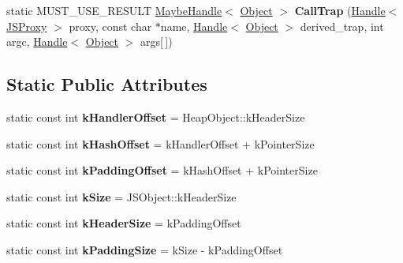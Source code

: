 \begin{DoxyCompactItemize}
\item 
\hypertarget{classv8_1_1internal_1_1_j_s_proxy_acb6cfffc6beeb32d176707a98ccaadd5}{}static M\+U\+S\+T\+\_\+\+U\+S\+E\+\_\+\+R\+E\+S\+U\+L\+T \hyperlink{classv8_1_1internal_1_1_maybe_handle}{Maybe\+Handle}$<$ \hyperlink{classv8_1_1internal_1_1_object}{Object} $>$ {\bfseries Call\+Trap} (\hyperlink{classv8_1_1internal_1_1_handle}{Handle}$<$ \hyperlink{classv8_1_1internal_1_1_j_s_proxy}{J\+S\+Proxy} $>$ proxy, const char $\ast$name, \hyperlink{classv8_1_1internal_1_1_handle}{Handle}$<$ \hyperlink{classv8_1_1internal_1_1_object}{Object} $>$ derived\+\_\+trap, int argc, \hyperlink{classv8_1_1internal_1_1_handle}{Handle}$<$ \hyperlink{classv8_1_1internal_1_1_object}{Object} $>$ args\mbox{[}$\,$\mbox{]})\label{classv8_1_1internal_1_1_j_s_proxy_acb6cfffc6beeb32d176707a98ccaadd5}

\end{DoxyCompactItemize}
\subsection*{Static Public Attributes}
\begin{DoxyCompactItemize}
\item 
\hypertarget{classv8_1_1internal_1_1_j_s_proxy_aa806e0b972c00bd7011605e4859a4a0e}{}static const int {\bfseries k\+Handler\+Offset} = Heap\+Object\+::k\+Header\+Size\label{classv8_1_1internal_1_1_j_s_proxy_aa806e0b972c00bd7011605e4859a4a0e}

\item 
\hypertarget{classv8_1_1internal_1_1_j_s_proxy_a168ff8fa92638a10a3cdd1f4701097df}{}static const int {\bfseries k\+Hash\+Offset} = k\+Handler\+Offset + k\+Pointer\+Size\label{classv8_1_1internal_1_1_j_s_proxy_a168ff8fa92638a10a3cdd1f4701097df}

\item 
\hypertarget{classv8_1_1internal_1_1_j_s_proxy_a912bf6dd6649f735f2c049b89c42a3e4}{}static const int {\bfseries k\+Padding\+Offset} = k\+Hash\+Offset + k\+Pointer\+Size\label{classv8_1_1internal_1_1_j_s_proxy_a912bf6dd6649f735f2c049b89c42a3e4}

\item 
\hypertarget{classv8_1_1internal_1_1_j_s_proxy_a59ed1c6e05e6ea07645c40c9567bfe8c}{}static const int {\bfseries k\+Size} = J\+S\+Object\+::k\+Header\+Size\label{classv8_1_1internal_1_1_j_s_proxy_a59ed1c6e05e6ea07645c40c9567bfe8c}

\item 
\hypertarget{classv8_1_1internal_1_1_j_s_proxy_a75f253e334d95eb148ef16abb838e25c}{}static const int {\bfseries k\+Header\+Size} = k\+Padding\+Offset\label{classv8_1_1internal_1_1_j_s_proxy_a75f253e334d95eb148ef16abb838e25c}

\item 
\hypertarget{classv8_1_1internal_1_1_j_s_proxy_afaafd345ddb93558d8993503bc14107f}{}static const int {\bfseries k\+Padding\+Size} = k\+Size -\/ k\+Padding\+Offset\label{classv8_1_1internal_1_1_j_s_proxy_afaafd345ddb93558d8993503bc14107f}

\end{DoxyCompactItemize}
